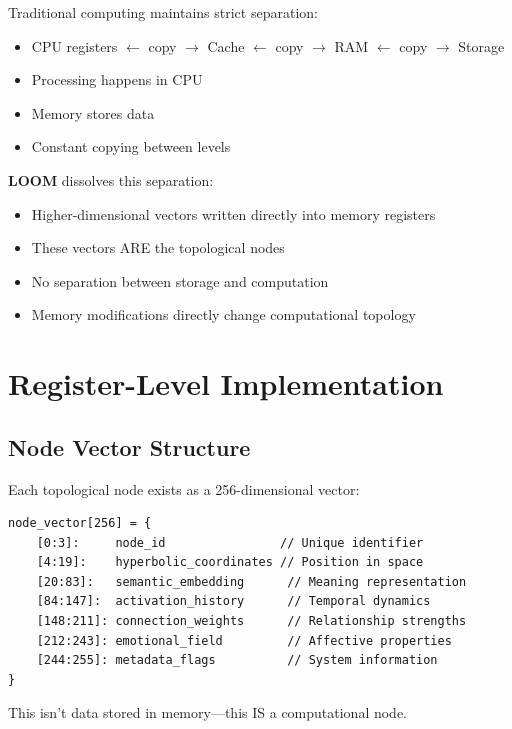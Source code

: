 \documentclass[12pt,a4paper,openany]{book} %
\newcommand{\loom}{\textbf{LOOM}}
\begin{document}
Traditional computing maintains strict separation:
\begin{itemize}
    \item CPU registers $\leftarrow$ copy $\rightarrow$ Cache $\leftarrow$ copy $\rightarrow$ RAM $\leftarrow$ copy $\rightarrow$ Storage
    \item Processing happens in CPU
    \item Memory stores data
    \item Constant copying between levels
\end{itemize}

\loom{} dissolves this separation:
\begin{itemize}
    \item Higher-dimensional vectors written directly into memory registers
    \item These vectors ARE the topological nodes
    \item No separation between storage and computation
    \item Memory modifications directly change computational topology
\end{itemize}

\section{Register-Level Implementation}

\subsection{Node Vector Structure}

Each topological node exists as a 256-dimensional vector:

\begin{mdframed}[backgroundcolor=codebg,fontcolor=white,linewidth=0pt]
\begin{verbatim}
node_vector[256] = {
    [0:3]:     node_id                // Unique identifier
    [4:19]:    hyperbolic_coordinates // Position in space
    [20:83]:   semantic_embedding      // Meaning representation
    [84:147]:  activation_history      // Temporal dynamics
    [148:211]: connection_weights      // Relationship strengths
    [212:243]: emotional_field         // Affective properties
    [244:255]: metadata_flags          // System information
}
\end{verbatim}
\end{mdframed}

This isn't data stored in memory—this IS a computational node.
\end{document}
